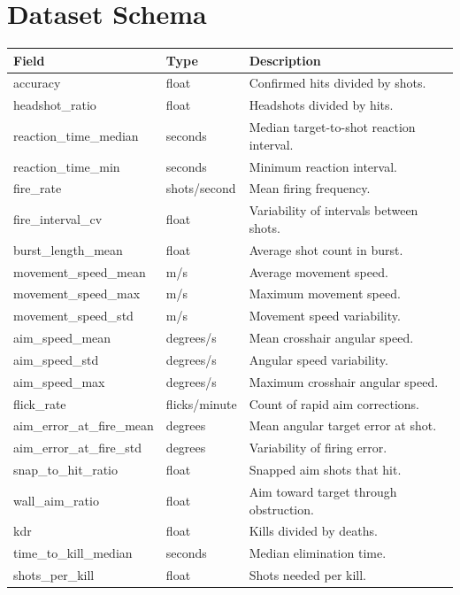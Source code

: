 \documentclass[12pt,a4paper,oneside]{report}
\begin{document}
\chapter{Dataset Schema}
\begin{longtable}{p{42mm}p{35mm}p{76mm}}
\toprule
Field & Type & Description\\
\midrule
accuracy & float & Confirmed hits divided by shots.\\
headshot\_ratio & float & Headshots divided by hits.\\
reaction\_time\_median & seconds & Median target-to-shot reaction interval.\\
reaction\_time\_min & seconds & Minimum reaction interval.\\
fire\_rate & shots/second & Mean firing frequency.\\
fire\_interval\_cv & float & Variability of intervals between shots.\\
burst\_length\_mean & float & Average shot count in burst.\\
movement\_speed\_mean & m/s & Average movement speed.\\
movement\_speed\_max & m/s & Maximum movement speed.\\
movement\_speed\_std & m/s & Movement speed variability.\\
aim\_speed\_mean & degrees/s & Mean crosshair angular speed.\\
aim\_speed\_std & degrees/s & Angular speed variability.\\
aim\_speed\_max & degrees/s & Maximum crosshair angular speed.\\
flick\_rate & flicks/minute & Count of rapid aim corrections.\\
aim\_error\_at\_fire\_mean & degrees & Mean angular target error at shot.\\
aim\_error\_at\_fire\_std & degrees & Variability of firing error.\\
snap\_to\_hit\_ratio & float & Snapped aim shots that hit.\\
wall\_aim\_ratio & float & Aim toward target through obstruction.\\
kdr & float & Kills divided by deaths.\\
time\_to\_kill\_median & seconds & Median elimination time.\\
shots\_per\_kill & float & Shots needed per kill.\\
\bottomrule
\end{longtable}
\end{document}
